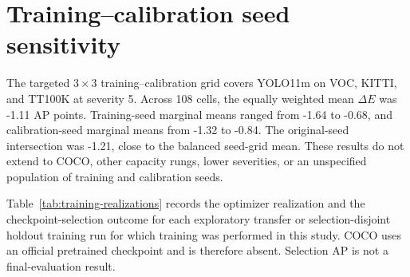 \documentclass[10pt]{article}
\newcommand{\DeltaE}{\Delta E}
\begin{document}
\begin{table}[htbp]
\centering
\caption{Per-corruption realization sensitivity. Variances are in squared AP
points. JPEG is deterministic and is excluded from the stochastic-only mean.}
\label{tab:realization-variance}
\small
\resizebox{0.92\textwidth}{!}{}
\end{table}

\begin{table}[htbp]
\centering
\caption{Scope and uncertainty target of the four conditional evidence layers.
The reported intervals are not interchangeable estimates of one parameter.}
\label{tab:conditionality-scope}
\scriptsize
\resizebox{\textwidth}{!}{}
\end{table}

\FloatBarrier

\section{Training--calibration seed sensitivity}

The targeted $3\times3$ training--calibration grid covers YOLO11m on VOC,
KITTI, and TT100K at severity 5. Across 108 cells, the equally weighted mean
$\DeltaE$ was -1.11 AP points. Training-seed marginal means ranged from -1.64
to -0.68, and calibration-seed marginal means from -1.32 to -0.84. The
original-seed intersection was -1.21, close to the balanced seed-grid mean.
These results do not extend to COCO, other capacity rungs, lower severities, or
an unspecified population of training and calibration seeds.

Table~\ref{tab:training-realizations} records the optimizer realization and the
checkpoint-selection outcome for each exploratory transfer or selection-disjoint holdout
training run for which training was performed in this study. COCO uses an
official pretrained checkpoint and is therefore absent. Selection AP is not a
final-evaluation result.

\begin{table}[htbp]
\centering
\caption{Training realizations and selected best epochs. Effective weight
decay records the realized batch/accumulation scaling. AP values are on the
0--100 scale and refer only to the checkpoint-selection partition.}
\label{tab:training-realizations}
\scriptsize
\resizebox{\textwidth}{!}{}
\end{table}
\end{document}
